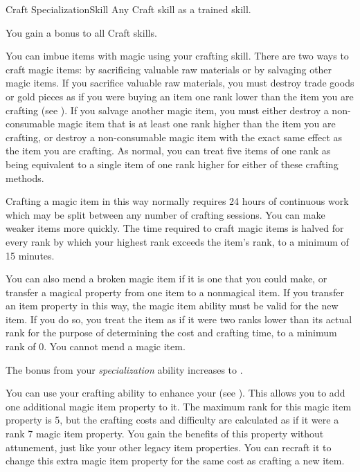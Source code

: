   \begin{feat}{Craft Specialization}{Skill}
    \featpre Any Craft skill as a trained skill.

     You gain a  bonus to all Craft skills.

     You can imbue items with magic using your crafting skill.
    There are two ways to craft magic items: by sacrificing valuable raw materials or by salvaging other magic items.
    If you sacrifice valuable raw materials, you must destroy trade goods or gold pieces as if you were buying an item one rank lower than the item you are crafting  (see ).
    If you salvage another magic item, you must either destroy a non-consumable magic item that is at least one rank higher than the item you are crafting, or destroy a non-consumable magic item with the exact same effect as the item you are crafting.
    As normal, you can treat five items of one rank as being equivalent to a single item of one rank higher for either of these crafting methods.

    Crafting a magic item in this way normally requires 24 hours of continuous work which may be split between any number of crafting sessions.
    You can make weaker items more quickly.
    The time required to craft magic items is halved for every rank by which your highest rank exceeds the item's rank, to a minimum of 15 minutes.

    You can also mend a broken magic item if it is one that you could make, or transfer a magical property from one item to a nonmagical item.
    If you transfer an item property in this way, the magic item ability must be valid for the new item.
    If you do so, you treat the item as if it were two ranks lower than its actual rank for the purpose of determining the cost and crafting time, to a minimum rank of 0.
    You cannot mend a  magic item.

     The bonus from your \textit{specialization} ability increases to .

     You can use your crafting ability to enhance your  (see ).
    This allows you to add one additional magic item property to it.
    The maximum rank for this magic item property is 5, but the crafting costs and difficulty are calculated as if it were a rank 7 magic item property.
    You gain the benefits of this property without attunement, just like your other legacy item properties.
    You can recraft it to change this extra magic item property for the same cost as crafting a new item.
  \end{feat}

